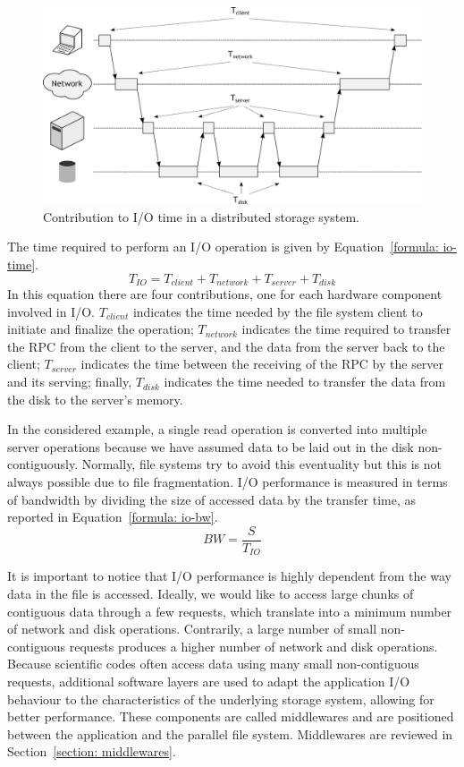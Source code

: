 \begin{figure}[!htb]
\centering
\includegraphics[width=\textwidth]{figures/rpc-request}
\caption{Contribution to I/O time in a distributed storage system.}
\label{figure: rpc-request}
\end{figure}

The time required to perform an I/O operation is given by Equation~\ref{formula: io-time}.
\begin{equation}\label{formula: io-time}
    T_{IO} = T_{client} + T_{network} + T_{server} + T_{disk}
\end{equation}
In this equation there are four contributions, one for each hardware component involved in I/O. $T_{client}$ indicates the time needed by the file system client to initiate and finalize the operation; $T_{network}$ 
indicates the time required to transfer the RPC from the client to the server, and the data from the server back to the client; $T_{server}$ indicates the time between the receiving of the RPC by the server and its 
serving; finally, $T_{disk}$ indicates the time needed to transfer the data from the disk to the server's memory.

In the considered example, a single read operation is converted into multiple server operations because we have assumed data to be laid out in the disk non-contiguously. Normally, file systems try to avoid this 
eventuality but this is not always possible due to file fragmentation. I/O performance is measured in terms of bandwidth by dividing the size of accessed data by the transfer time, as reported in Equation~\ref{formula: io-bw}.
\begin{equation}\label{formula: io-bw}
    BW = \frac{S}{T_{IO}}
\end{equation}

It is important to notice that I/O performance is highly dependent from the way data in the file is accessed. Ideally, we would like to access large chunks of contiguous data through a few requests, which translate 
into a minimum number of network and disk operations. Contrarily, a large number of small non-contiguous requests produces a higher number of network and disk operations. Because scientific codes often access data using
many small non-contiguous requests, additional software layers are used to adapt the application I/O behaviour to the characteristics of the underlying storage system, allowing for better performance. These components
are called middlewares and are positioned between the application and the parallel file system. Middlewares are reviewed in Section~\ref{section: middlewares}.

